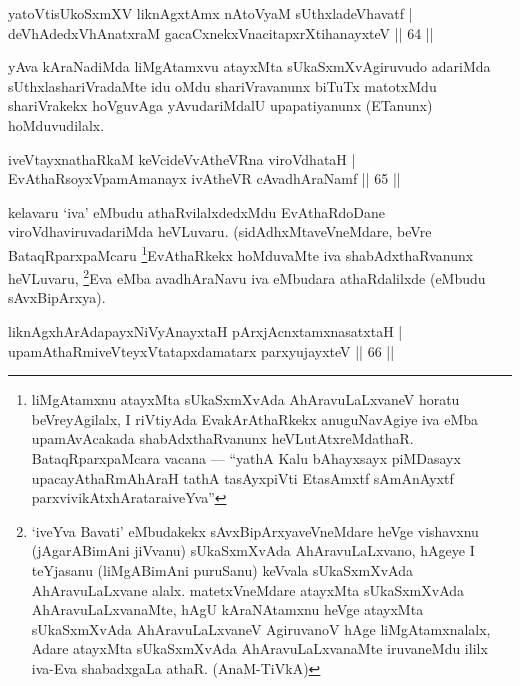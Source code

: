 \begin{shl}
yatoV\s tisUkoSxmXV liknAgxtAmx nAtoV\s yaM sUthxladeVhavatf |\\
deVhAdedxVhAnatxraM gacaCxnekxVnacitapxrXtihanayxteV \hfill || 64 || 
\end{shl}

\begin{artha}
yAva kAraNadiMda liMgAtamxvu atayxMta sUkaSxmXvAgiruvudo adariMda sUthxlashariVradaMte idu oMdu shariVravanunx biTuTx matotxMdu shariVrakekx hoVguvAga yAvudariMdalU upapatiyanunx (ETanunx) hoMduvudilalx.
\end{artha}


\begin{shl}
iveVtayxnathaRkaM keVcideVvAtheVRna viroVdhataH |\\
EvAthaRsoyxVpamAmanayx ivAtheVR cAvadhAraNamf \hfill || 65 || 
\end{shl}

\begin{artha}
kelavaru `iva' eMbudu athaRvilalxdedxMdu EvAthaRdoDane viroVdhaviruvadariMda heVLuvaru. (sidAdhxMtaveVneMdare, beVre BataqRparxpaMcaru \footnote{liMgAtamxnu atayxMta sUkaSxmXvAda AhAravuLaLxvaneV horatu beVreyAgilalx, I riVtiyAda EvakArAthaRkekx anuguNavAgiye iva eMba upamAvAcakada shabAdxthaRvanunx heVLutAtxreMdathaR. BataqRparxpaMcara vacana --- ``yathA Kalu bAhayxsayx piMDasayx upacayAthaRmAhAraH tathA tasAyxpiVti EtasAmxtf sAmAnAyxtf parxvivikAtxhArataraiveYva''}EvAthaRkekx hoMduvaMte iva shabAdxthaRvanunx heVLuvaru, \footnote{`iveYva Bavati' eMbudakekx sAvxBipArxyaveVneMdare heVge vishavxnu (jAgarABimAni jiVvanu) sUkaSxmXvAda AhAravuLaLxvano, hAgeye I teYjasanu (liMgABimAni puruSanu) keVvala sUkaSxmXvAda AhAravuLaLxvane alalx. matetxVneMdare atayxMta sUkaSxmXvAda AhAravuLaLxvanaMte, hAgU kAraNAtamxnu heVge atayxMta sUkaSxmXvAda AhAravuLaLxvaneV AgiruvanoV hAge liMgAtamxnalalx, Adare atayxMta sUkaSxmXvAda AhAravuLaLxvanaMte iruvaneMdu ililx iva-Eva shabadxgaLa athaR. (AnaM-TiVkA)}Eva eMba avadhAraNavu iva eMbudara athaRdalilxde (eMbudu sAvxBipArxya).
\end{artha}


\begin{shl}
liknAgxhArAdapayxNiVyAnayxtaH pArxjAcnxtamxnasatxtaH |\\
upamAthaRmiveVteyxVtatapxdamatarx parxyujayxteV \hfill || 66 || 
\end{shl}

